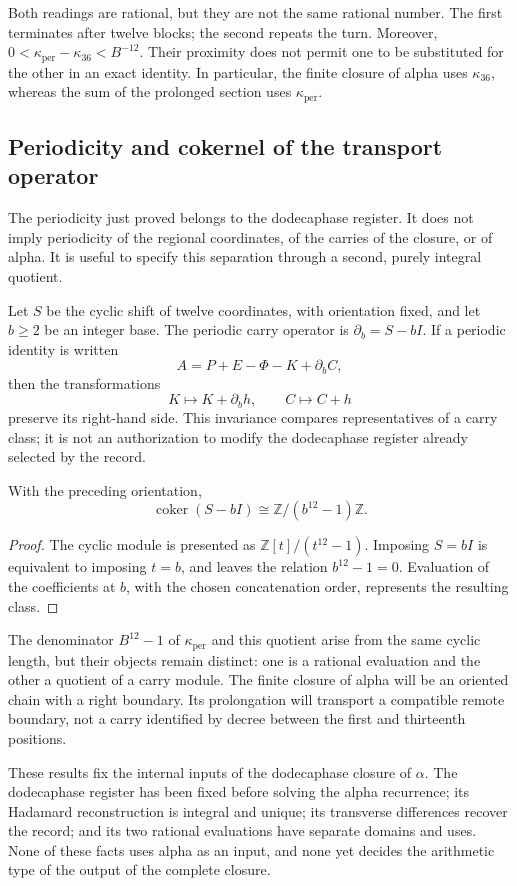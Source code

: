 Both readings are rational, but they are not the same rational number. The
first terminates after twelve blocks; the second repeats the turn. Moreover,
\(0<\kappa_{\mathrm{per}}-\kappa_{36}<B^{-12}\). Their proximity does not
permit one to be substituted for the other in an exact identity. In
particular, the finite closure of alpha uses \(\kappa_{36}\), whereas the sum
of the prolonged section uses \(\kappa_{\mathrm{per}}\).



\subsection{Periodicity and cokernel of the transport operator}
\label{subsec:k-clase-acarreo}

The periodicity just proved belongs to the dodecaphase register. It does not
imply periodicity of the regional coordinates, of the carries of the closure,
or of alpha. It is useful to specify this separation through a second, purely
integral quotient.

Let \(S\) be the cyclic shift of twelve coordinates, with orientation fixed,
and let \(b\geq2\) be an integer base. The periodic carry operator is
\(\partial_b=S-bI\). If a periodic identity is written
\[
 A=P+E-\Phi-K+\partial_bC,
\]
then the transformations
\[
 K\longmapsto K+\partial_bh,\qquad C\longmapsto C+h
\]
preserve its right-hand side. This invariance compares representatives of a
carry class; it is not an authorization to modify the dodecaphase register
already selected by the record.

\begin{proposition}
\label{prop:k-cociente-acarreo}
With the preceding orientation,
\[
 \operatorname{coker}(S-bI)\cong\mathbb Z/(b^{12}-1)\mathbb Z.
\]
\end{proposition}

\begin{proof}
The cyclic module is presented as \(\mathbb Z[t]/(t^{12}-1)\). Imposing
\(S=bI\) is equivalent to imposing \(t=b\), and leaves the relation
\(b^{12}-1=0\). Evaluation of the coefficients at \(b\), with the chosen
concatenation order, represents the resulting class.
\end{proof}

The denominator \(B^{12}-1\) of \(\kappa_{\mathrm{per}}\) and this quotient
arise from the same cyclic length, but their objects remain distinct: one is a
rational evaluation and the other a quotient of a carry module. The finite
closure of alpha will be an oriented chain with a right boundary. Its
prolongation will transport a compatible remote boundary, not a carry
identified by decree between the first and thirteenth positions.

These results fix the internal inputs of the dodecaphase closure of
\(\alpha\). The dodecaphase register has been fixed before solving the alpha
recurrence; its Hadamard reconstruction is integral and unique; its
transverse differences recover the record; and its two rational evaluations
have separate domains and uses. None of these facts uses alpha as an input,
and none yet decides the arithmetic type of the output of the complete
closure.
